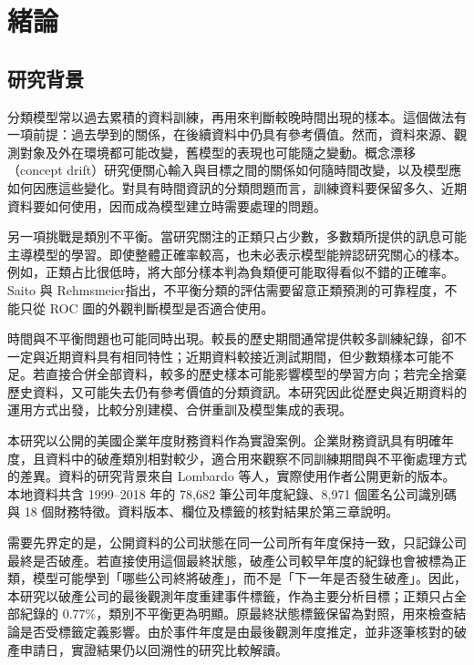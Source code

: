 \chapter{緒論}\label{chap:introduction}
\begingroup
\setlength{\emergencystretch}{2em}

\section{研究背景}

分類模型常以過去累積的資料訓練，再用來判斷較晚時間出現的樣本。這個做法有一項前提：過去學到的關係，在後續資料中仍具有參考價值。然而，資料來源、觀測對象及外在環境都可能改變，舊模型的表現也可能隨之變動。概念漂移（concept drift）研究便關心輸入與目標之間的關係如何隨時間改變，以及模型應如何因應這些變化\autocite{gama2014drift}。對具有時間資訊的分類問題而言，訓練資料要保留多久、近期資料要如何使用，因而成為模型建立時需要處理的問題。

另一項挑戰是類別不平衡。當研究關注的正類只占少數，多數類所提供的訊息可能主導模型的學習。即使整體正確率較高，也未必表示模型能辨認研究關心的樣本。例如，正類占比很低時，將大部分樣本判為負類便可能取得看似不錯的正確率。Saito 與 Rehmsmeier\autocite{saito2015pr}指出，不平衡分類的評估需要留意正類預測的可靠程度，不能只從 ROC 圖的外觀判斷模型是否適合使用。

時間與不平衡問題也可能同時出現。較長的歷史期間通常提供較多訓練紀錄，卻不一定與近期資料具有相同特性；近期資料較接近測試期間，但少數類樣本可能不足。若直接合併全部資料，較多的歷史樣本可能影響模型的學習方向；若完全捨棄歷史資料，又可能失去仍有參考價值的分類資訊。本研究因此從歷史與近期資料的運用方式出發，比較分別建模、合併重訓及模型集成的表現。

本研究以公開的美國企業年度財務資料作為實證案例。企業財務資訊具有明確年度，且資料中的破產類別相對較少，適合用來觀察不同訓練期間與不平衡處理方式的差異。資料的研究背景來自 Lombardo 等人\autocite{lombardo2022bankruptcy}，實際使用作者公開更新的版本\autocite{sowide-bankruptcy-data}。本地資料共含 1999--2018 年的 78,682 筆公司年度紀錄、8,971 個匿名公司識別碼與 18 個財務特徵。資料版本、欄位及標籤的核對結果於第三章說明。

需要先界定的是，公開資料的公司狀態在同一公司所有年度保持一致，只記錄公司最終是否破產。若直接使用這個最終狀態，破產公司較早年度的紀錄也會被標為正類，模型可能學到「哪些公司終將破產」，而不是「下一年是否發生破產」。因此，本研究以破產公司的最後觀測年度重建事件標籤，作為主要分析目標；正類只占全部紀錄的 0.77\%，類別不平衡更為明顯。原最終狀態標籤保留為對照，用來檢查結論是否受標籤定義影響。由於事件年度是由最後觀測年度推定，並非逐筆核對的破產申請日，實證結果仍以回溯性的研究比較解讀。

